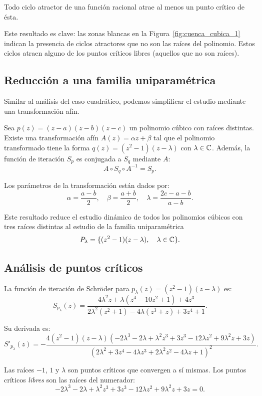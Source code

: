 \begin{teorema}
\label{teo:fatou_julia}
Todo ciclo atractor de una función racional atrae al menos un punto crítico de ésta.
\end{teorema}

Este resultado es clave: las zonas blancas en la Figura~\ref{fig:cuenca_cubica_1} indican la presencia de ciclos atractores que no son las raíces del polinomio. Estos ciclos atraen alguno de los puntos críticos libres (aquellos que no son raíces).

\subsection{Reducción a una familia uniparamétrica}

Similar al análisis del caso cuadrático, podemos simplificar el estudio mediante una transformación afín.

\begin{teorema}
Sea $p(z)=(z-a)(z-b)(z-c)$ un polinomio cúbico con raíces distintas. Existe una transformación afín $A(z)=\alpha z+\beta$ tal que el polinomio transformado tiene la forma $q(z)=(z^2-1)(z-\lambda)$ con $\lambda\in\mathbb{C}$. Además, la función de iteración $S_p$ es conjugada a $S_q$ mediante $A$:
$$
A\circ S_q\circ A^{-1}=S_p.
$$
\end{teorema}

Los parámetros de la transformación están dados por:
$$
\alpha=\frac{a-b}{2}, \quad \beta=\frac{a+b}{2}, \quad \lambda=\frac{2c-a-b}{a-b}.
$$

Este resultado reduce el estudio dinámico de todos los polinomios cúbicos con tres raíces distintas al estudio de la familia uniparamétrica
$$
P_\lambda=\{(z^2-1)(z-\lambda), \quad \lambda\in\mathbb{C}\}.
$$

\subsection{Análisis de puntos críticos}

La función de iteración de Schröder para $p_\lambda(z)=(z^2-1)(z-\lambda)$ es:
$$
S_{p_\lambda}(z)=\frac{4\lambda^2 z+\lambda(z^4-10z^2+1)+4z^3}{2\lambda^2(z^2+1)-4\lambda(z^3+z)+3z^4+1}.
$$

Su derivada es:
$$
S'_{p_\lambda}(z)=-\frac{4(z^2-1)(z-\lambda)(-2\lambda^3-2\lambda+\lambda^2 z^3+3z^3-12\lambda z^2+9\lambda^2 z+3z)}{(2\lambda^2+3z^4-4\lambda z^3+2\lambda^2 z^2-4\lambda z+1)^2}.
$$

Las raíces $-1$, $1$ y $\lambda$ son puntos críticos que convergen a sí mismas. Los puntos críticos \emph{libres} son las raíces del numerador:
$$
-2\lambda^3-2\lambda+\lambda^2 z^3+3z^3-12\lambda z^2+9\lambda^2 z+3z=0.
$$

